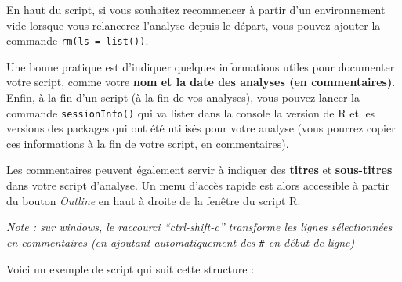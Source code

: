 \documentclass[
]{book}
\begin{document}
En haut du script, si vous souhaitez recommencer à partir d'un environnement vide lorsque vous relancerez l'analyse depuis le départ, vous pouvez ajouter la commande \texttt{rm(ls\ =\ list())}.

Une bonne pratique est d'indiquer quelques informations utiles pour documenter votre script, comme votre \textbf{nom et la date des analyses (en commentaires)}. Enfin, à la fin d'un script (à la fin de vos analyses), vous pouvez lancer la commande \texttt{sessionInfo()} qui va lister dans la console la version de R et les versions des packages qui ont été utilisés pour votre analyse (vous pourrez copier ces informations à la fin de votre script, en commentaires).

Les commentaires peuvent également servir à indiquer des \textbf{titres} et \textbf{sous-titres} dans votre script d'analyse. Un menu d'accès rapide est alors accessible à partir du bouton \emph{Outline} en haut à droite de la fenêtre du script R.

\emph{Note : sur windows, le raccourci ``ctrl-shift-c'' transforme les lignes sélectionnées en commentaires (en ajoutant automatiquement des \texttt{\#} en début de ligne)}

Voici un exemple de script qui suit cette structure :
\end{document}
